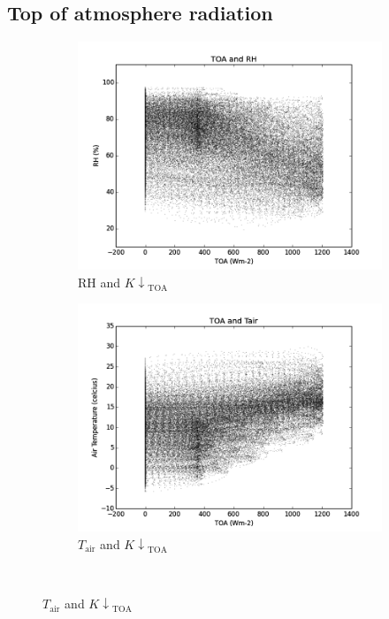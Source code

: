 \documentclass[a4paper,titlepage, twoside]{report}
\newcommand\Kdowntoa{{K\!\!\downarrow}_\mathrm{TOA}}
\begin{document}
\subsection{Top of atmosphere radiation}
\begin{figure}
\centering
\begin{subfigure}{0.48\textwidth}
\includegraphics[width=\textwidth]{016_TOA_RH.png}
\caption{$\mathrm{RH}$ and $\Kdowntoa$}
\end{subfigure}
\hfill
\begin{subfigure}{0.48\textwidth}
\includegraphics[width=\textwidth]{017_TOA_Tair.png}
\caption{$T_\mathrm{air}$ and $\Kdowntoa$}
\end{subfigure}
\\

\end{figure}
\end{document}
